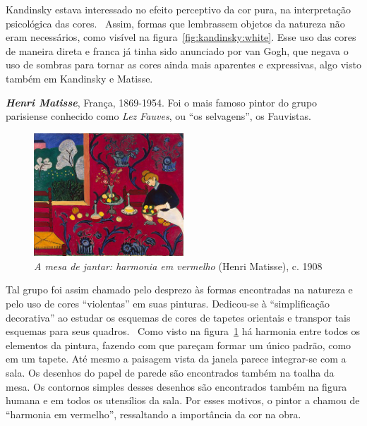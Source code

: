 Kandinsky estava interessado no efeito
perceptivo da cor pura, na interpretação psicológica das
cores.~\cite{ione} Assim, formas que lembrassem objetos da natureza
não eram necessários, como visível na
figura~\ref{fig:kandinsky:white}. Esse uso das cores de maneira direta
e franca já tinha sido anunciado por van Gogh, que negava o uso de
sombras para tornar as cores ainda mais aparentes e expressivas, algo
visto também em Kandinsky e Matisse.

\textbf{\emph{Henri Matisse}}, França, 1869-1954. Foi o mais famoso
pintor do grupo parisiense conhecido como \textit{Lez Fauves}, ou ``os
selvagens'', os Fauvistas.~\cite{elderfield,freeman}

\begin{figure}
  \begin{centering}
    \caption{\emph{A mesa de jantar: harmonia em vermelho} (Henri Matisse), c. 1908}
    \label{fig:matisse:red}
    \includegraphics[width=0.5\textwidth]{figs/matisse_red.png}
  \end{centering}
\end{figure}

Tal grupo foi assim chamado pelo desprezo às formas encontradas na
natureza e pelo uso de cores ``violentas'' em suas
pinturas. Dedicou-se à ``simplificação decorativa'' ao estudar os
esquemas de cores de tapetes orientais e transpor tais esquemas para
seus quadros.~\cite{gombrich} Como visto na
figura~\ref{fig:matisse:red} há harmonia entre todos os elementos da
pintura, fazendo com que pareçam formar um único padrão, como em um
tapete. Até mesmo a paisagem vista da janela parece integrar-se com a
sala. Os desenhos do papel de parede são encontrados também na toalha
da mesa. Os contornos simples desses desenhos são encontrados também na figura
humana e em todos os utensílios da sala. Por esses motivos, o pintor a
chamou de ``harmonia em vermelho'', ressaltando a importância da cor
na obra.~\cite{matisse}

